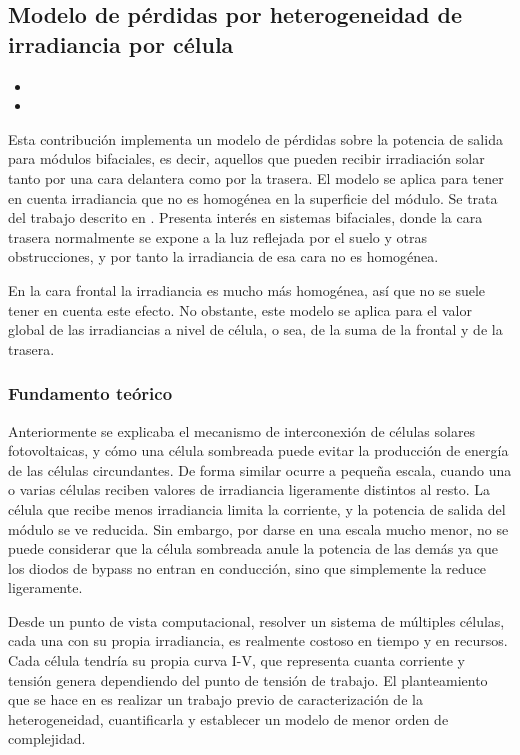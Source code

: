 \subsection{Modelo de pérdidas por heterogeneidad de irradiancia por célula} \label{sct:desarrollo:contribuciones_cientificas:heterogeneidad_irradiancia}

\begin{itemize}
    \item {}
    \item {}
\end{itemize}

Esta contribución implementa un modelo de pérdidas sobre la potencia de salida para módulos bifaciales, es decir, aquellos que pueden recibir irradiación solar tanto por una cara delantera como por la trasera. El modelo se aplica para tener en cuenta irradiancia que no es homogénea en la superficie del módulo. Se trata del trabajo descrito en \cite{Deline_Ayala_Pelaez_MacAlpine_Olalla_2020}.
Presenta interés en sistemas bifaciales, donde la cara trasera normalmente se expone a la luz reflejada por el suelo y otras obstrucciones, y por tanto la irradiancia de esa cara no es homogénea.

En la cara frontal la irradiancia es mucho más homogénea, así que no se suele tener en cuenta este efecto. No obstante, este modelo se aplica para el valor global de las irradiancias a nivel de célula, o sea, de la suma de la frontal y de la trasera.

\subsubsection{Fundamento teórico}

Anteriormente se explicaba el mecanismo de interconexión de células solares fotovoltaicas, y cómo una célula sombreada puede evitar la producción de energía de las células circundantes. De forma similar ocurre a pequeña escala, cuando una o varias células reciben valores de irradiancia ligeramente distintos al resto. La célula que recibe menos irradiancia limita la corriente, y la potencia de salida del módulo se ve reducida. Sin embargo, por darse en una escala mucho menor, no se puede considerar que la célula sombreada anule la potencia de las demás ya que los diodos de bypass no entran en conducción, sino que simplemente la reduce ligeramente.

Desde un punto de vista computacional, resolver un sistema de múltiples células, cada una con su propia irradiancia, es realmente costoso en tiempo y en recursos. Cada célula tendría su propia curva I-V, que representa cuanta corriente y tensión genera dependiendo del punto de tensión de trabajo. El planteamiento que se hace en \cite{Deline_Ayala_Pelaez_MacAlpine_Olalla_2020} es realizar un trabajo previo de caracterización de la heterogeneidad, cuantificarla y establecer un modelo de menor orden de complejidad.

